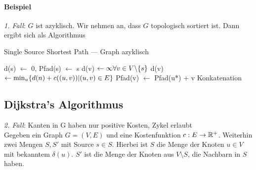                 \paragraph{Beispiel}
                    \emph{1. Fall}: $G$ ist azyklisch. Wir nehmen an, dass $G$ topologisch sortiert ist.  Dann ergibt sich als Algorithmus
                    
                    \begin{algorithm}
                    	\caption{Single Source Shortest Path --- Graph azyklisch}
                    	\label{alg:sssp1}
                    	\begin{algorithmic}
                    		\State d(s) $\gets$ 0, Pfad(s) $\gets$ s
                    		\State d(v) $\gets \infty \forall v\in V\backslash \{s\}$
                    			\State d(v) $\gets \min_u\{d(n)+c((u,v)) | (u,v)\in E\}$
                    			\State Pfad(v) $\gets$ Pfad(u*) + v \Comment Konkatenation
                    		\EndFor
                    	\end{algorithmic}
                    \end{algorithm}
                    

            \subsection{Dijkstra's Algorithmus}
						\emph{2. Fall}: Kanten in G haben nur positive Kosten, Zykel erlaubt\\
            Gegeben ein Graph $G = (V, E)$ und eine Kostenfunktion $c: E \to \mathbb{R}^+$.
            Weiterhin zwei Mengen $S, S'$ mit Source $s \in S$. Hierbei ist $S$ die Menge der Knoten $u \in V$ mit bekanntem $\delta(u)$. $S'$ ist die Menge der Knoten aus $V \setminus S$, die Nachbarn in $S$ haben.

